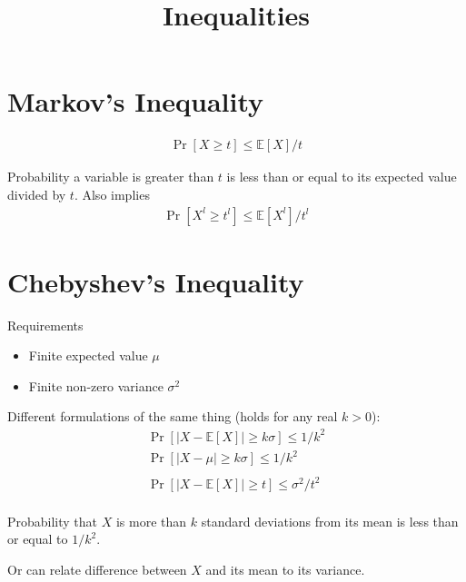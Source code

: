 \documentclass[11pt]{article}
\title{Inequalities}
\newcommand{\eq}[1]{\begin{align*}#1\end{align*}}
\begin{document}
\maketitle

\section{Markov's Inequality}
\eq{
\Pr[X \geq t] \leq \mathbb{E}[X]/t
}

Probability a variable is greater than $t$ is less than or equal to its expected value divided by $t$. Also implies
\eq{
\Pr[X^l \geq t^l] \leq \mathbb{E}[X^l]/t^l
}

\section{Chebyshev's Inequality}
Requirements
\begin{itemize}
\item Finite expected value $\mu$
\item Finite non-zero variance $\sigma^2$
\end{itemize}

Different formulations of the same thing (holds for any real $k > 0$):
\eq{
\Pr[|X - \mathbb{E}[X]| \geq k\sigma] \leq 1/k^2 \\
\Pr[|X - \mu| \geq k\sigma] \leq 1/k^2 \\ \\
\Pr[|X - \mathbb{E}[X]| \geq t] \leq \sigma^2/t^2 \\
}

Probability that $X$ is more than $k$ standard deviations from its mean is less than or equal to $1/k^2$.

Or can relate difference between $X$ and its mean to its variance.
\end{document}
